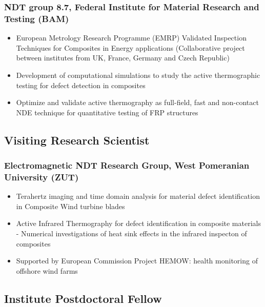 \documentclass{my_cv}%
\begin{document}
\subsubsection{NDT group 8.7, Federal Institute for Material Research and Testing (BAM)}
\begin{itemize}[leftmargin=0.15in]
\setlength\itemsep{-0.1em}
\color{mygray}
\item European Metrology Research Programme (EMRP) Validated Inspection Techniques for Composites in Energy applications (Collaborative project between institutes from UK, France, Germany and Czech Republic)
\item Development of computational simulations to study the active thermographic testing for defect detection in composites
\item Optimize and validate active thermography as full-field, fast and non-contact NDE technique for quantitative testing of FRP structures
\end{itemize}
{\color{mygray1} \hdashrule[0.1ex]{18.8cm}{0.2mm}{1mm}}
\subsection{Visiting Research Scientist}
\subsubsection{Electromagnetic NDT Research Group, West Pomeranian University (ZUT)}
\begin{itemize}[leftmargin=0.15in]
\setlength\itemsep{-0.1em}
\color{mygray}
\item Terahertz imaging and time domain analysis for material defect identification in Composite Wind turbine blades
\item Active Infrared Thermography for defect identification in composite materials - Numerical investigations of heat sink effects in the infrared inspecton of composites
\item Supported by European Commission Project HEMOW: health monitoring of offshore wind farms
\end{itemize}
{\color{mygray1} \hdashrule[0.1ex]{18.8cm}{0.2mm}{1mm}}
\subsection{Institute Postdoctoral Fellow}
\end{document}
